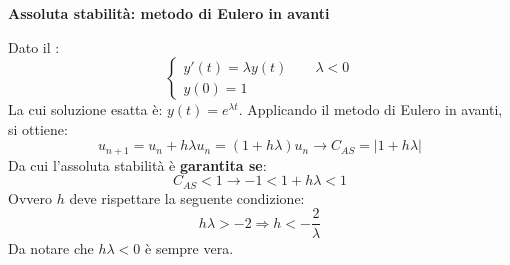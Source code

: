 \highspace
\begin{flushleft}
	\textcolor{Red2}{ \textbf{Assoluta stabilità: metodo di Eulero in avanti}}
\end{flushleft}
Dato il :
\begin{equation*}
	\begin{cases}
		y'\left(t\right) = \lambda y\left(t\right) \hspace{2em} \lambda < 0 \\
		y\left(0\right) = 1
	\end{cases}
\end{equation*}
La cui soluzione esatta è: $y\left(t\right) = e^{\lambda t}$. Applicando il metodo di Eulero in avanti, si ottiene:
\begin{equation*}
	u_{n+1} = u_{n} + h\lambda u_{n} = \left(1+h\lambda\right)u_{n} \longrightarrow C_{AS} = \left|1 + h\lambda\right|
\end{equation*}
Da cui l'assoluta stabilità è \textbf{garantita se}:
\begin{equation*}
	C_{AS} < 1 \longrightarrow -1 < 1 + h\lambda < 1
\end{equation*}
Ovvero $h$ deve rispettare la seguente condizione:
\begin{equation}
	h\lambda > -2 \Rightarrow h < -\dfrac{2}{\lambda}
\end{equation}
Da notare che $h\lambda < 0$ è sempre vera.

